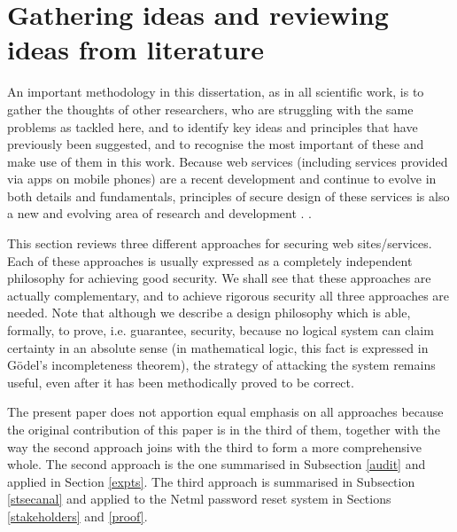 \section{Gathering ideas and reviewing ideas from literature}


An important methodology in this dissertation, as in all scientific work, is to gather the thoughts of other researchers, who are struggling with the same problems as tackled here, and to identify key ideas and principles that have previously been suggested, and to recognise the most important of these and make use of them in this work.
\if
Because web services (including services provided via apps on mobile phones)
are a recent development and continue to evolve in both details and fundamentals,
principles of secure design of these services is also a new and evolving area of
research and development \cite{AddieColman2010,Addie_Moffatt_Dekeyser_Colman2011}.
\else\cite{Addie_Moffatt_Dekeyser_Colman2011}.
\fi

This section reviews three different approaches for securing web sites/services.
Each of these approaches is usually expressed as a completely independent
philosophy for achieving good security. We shall see that these approaches 
are actually complementary, and to achieve rigorous security all three approaches
are needed. Note that although we describe a design philosophy which is able, formally, to prove,
i.e.  guarantee, security, because no logical system can claim certainty in an absolute
sense (in mathematical logic, this fact is expressed in G\"odel's incompleteness theorem), the strategy 
of attacking the system remains useful, even after it has been
methodically proved to be correct.

The present paper does not apportion equal emphasis on all approaches
because the original contribution of this paper is 
in the third of them, together with the way the second approach joins
with the third to form a more comprehensive whole. The second approach
is the one summarised in Subsection \ref{audit} and applied
in Section \ref{expts}.
The third approach is summarised in Subsection \ref{stsecanal} and applied
to the Netml password reset system in Sections \ref{stakeholders} and \ref{proof}.








